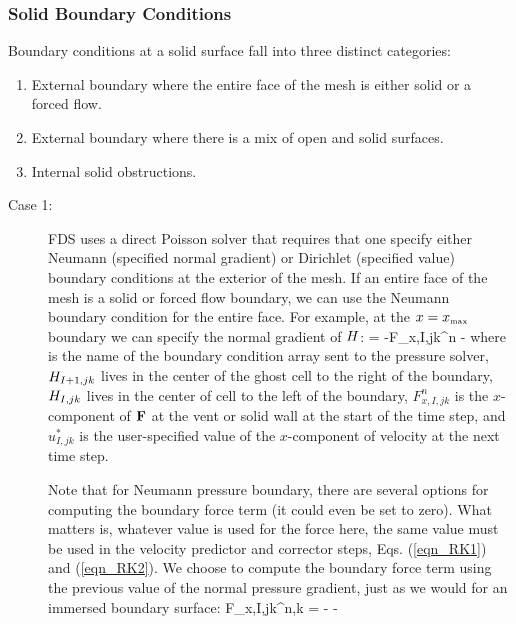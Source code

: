 \subsubsection{Solid Boundary Conditions}

Boundary conditions at a solid surface fall into three distinct categories:
\begin{enumerate}
\item External boundary where the entire face of the mesh is either solid or a forced flow.
\item External boundary where there is a mix of open and solid surfaces.
\item Internal solid obstructions.
\end{enumerate}

\begin{description}
\item[Case 1:] FDS uses a direct Poisson solver that requires that one specify either Neumann (specified normal gradient) or Dirichlet (specified value) boundary conditions at the exterior of the mesh. If an entire face of the mesh is a solid or forced flow boundary, we can use the Neumann boundary condition for the entire face. For example, at the $x=x_{\hbox{\tiny max}}$ boundary we can specify the normal gradient of $H$:
\be
{} \equiv {} = -F_{x,I,jk}^n - 
\label{dbc}
\ee
where  is the name of the boundary condition array sent to the pressure solver, $H_{I+1,jk}$ lives in the center of the ghost cell to the right of the boundary, $H_{I,jk}$ lives in the center of cell to the left of the boundary, $F_{x,I,jk}^n$ is the $x$-component of ${\mathbf{F}}$ at the vent or solid wall at the start of the time step, and $u_{I,jk}^*$ is the user-specified value of the $x$-component of velocity at the next time step.

Note that for Neumann pressure boundary, there are several options for computing the boundary force term (it could even be set to zero).  What matters is, whatever value is used for the force here, the same value must be used in the velocity predictor and corrector steps, Eqs. (\ref{eqn_RK1}) and (\ref{eqn_RK2}).  We choose to compute the boundary force term using the previous value of the normal pressure gradient, just as we would for an immersed boundary surface:
\be
F_{x,I,jk}^{n,k} =  -  - 
\label{Fboundary}
\ee


\end{description}
